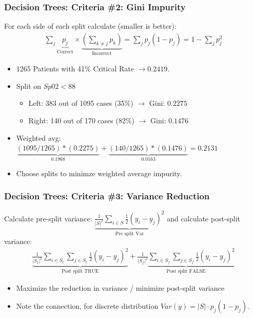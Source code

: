 \documentclass[xcolor=pdftex,dvipsnames,table,mathserif,aspectratio=169]{beamer}
\begin{document}
\begin{frame}
\frametitle{Decision Trees: Criteria \#2: Gini Impurity}
For each side of each split calculate (smaller is better):
\begin{align*}
\sum_j \underbrace{p_j}_{\text{Correct}} \times \underbrace{( \sum_{k \neq j} p_k )}_{\text{Incorrect}} =\sum_j p_j (1 -p_j) = 1 -\sum_j p_j^2 
\end{align*}
\begin{itemize}
\item 1265 Patients with 41\% Critical Rate $\rightarrow 0.2419$.
\item Split on $Sp02 < 88$
\begin{itemize} 
\item Left: 383 out of 1095 cases (35\%) $\rightarrow $ Gini: $0.2275$
\item Right: 140 out of 170 cases (82\%) $\rightarrow $ Gini: $0.1476$
\end{itemize}
\item Weighted avg: $\underbrace{(1095/1265)*(0.2275)}_{0.1968} + \underbrace{(140/1265)*(0.1476)}_{0.0163} = 0.2131$
\item Choose splits to minimze weighted average impurity.
\end{itemize}
\end{frame}



\begin{frame}
\frametitle{Decision Trees: Criteria \#3: Variance Reduction}
Calculate pre-split variance: $\underbrace{\frac{1}{|S|^{2}} \sum_{i \in S} \frac{1}{2}\left(y_{i}-y_{j}\right)^{2}}_{\text{Pre split Var}}$ and calculate post-split variance:
\begin{align*}
\underbrace{\frac{1}{\left|S_{t}\right|^{2}} \sum_{i \in S_{t}} \sum_{j \in S_{t}} \frac{1}{2}\left(y_{i}-y_{j}\right)^{2}}_{\text{Post split  TRUE}}
+\underbrace{\frac{1}{\left|S_{f}\right|^{2}} \sum_{i \in S_{f}} \sum_{j \in S_{f}} \frac{1}{2}\left(y_{i}-y_{j}\right)^{2}}_{\text{Post split FALSE}}
\end{align*}
\begin{itemize}
\item Maximize the \alert{reduction} in variance / minimize post-split variance
\item Note the connection, for discrete distribution $Var(y) = |S| \cdot p_j (1-p_j)$.
\end{itemize}
\end{frame}
\end{document}
